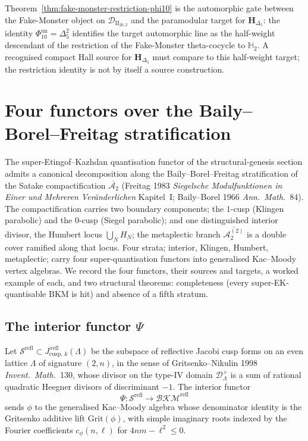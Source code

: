 Theorem~\ref{thm:fake-monster-restriction-phi10} is the automorphic gate
between the Fake-Monster object on $\mathcal{D}_{\mathrm{II}_{26,2}}$ and
the paramodular target for $\mathbf{H}_{\Delta_5}$: the identity
\(\Phi_{10}^{\mathrm{un}}=\Delta_5^2\) identifies the target automorphic
line as the half-weight descendant of the restriction of the Fake-Monster
theta-cocycle to $\mathbb{H}_2$.  A recognised compact Hall source for
$\mathbf{H}_{\Delta_5}$ must compare to this half-weight target; the
restriction identity is not by itself a source construction.

\section{Four functors over the Baily--Borel--Freitag stratification}
\label{sec:four-functors-baily-borel-freitag}

The super-Etingof--Kazhdan quantisation functor of
the structural-genesis section admits a canonical decomposition along
the Baily--Borel--Freitag stratification of the Satake compactification
$\overline{\mathcal A_2}$ (Freitag 1983 \textit{Siegelsche Modulfunktionen
in Einer und Mehreren Ver\"anderlichen} Kapitel~I; Baily--Borel 1966
\textit{Ann.~Math.}~84). The compactification carries two boundary
components; the $1$-cusp (Klingen parabolic) and the $0$-cusp
(Siegel parabolic); and one distinguished interior divisor, the
Humbert locus $\bigcup_N H_N$; the metaplectic branch
$\overline{\mathcal A_2^{(2)}}$ is a double cover ramified along that
locus. Four strata; interior, Klingen, Humbert, metaplectic; carry
four super-quantisation functors into generalised Kac--Moody vertex
algebras. We record the four functors, their sources and
targets, a worked example of each, and two structural theorems:
completeness (every super-EK-quantisable BKM is hit) and absence of
a fifth stratum.

\subsection{The interior functor \texorpdfstring{$\Psi$}{Psi}}
\label{subsec:psi-interior}

\begin{definition}
\label{def:psi-reflective}
Let $\mathcal S^{\mathrm{refl}} \subset
J_{\mathrm{cusp},\,k}^{\,\mathrm{refl}}(\Lambda)$ be the subspace
of reflective Jacobi cusp forms on an even lattice $\Lambda$ of
signature $(2, n)$, in the sense of Gritsenko--Nikulin 1998
\textit{Invent.~Math.}~130, whose divisor on the type-IV domain
$\mathcal D_\Lambda^+$ is a sum of rational quadratic Heegner
divisors of discriminant $-1$. The interior functor
\[
\Psi : \mathcal S^{\mathrm{refl}}
\longrightarrow \mathcal{BKM}^{\mathrm{refl}}
\]
sends $\phi$ to the generalised Kac--Moody algebra whose
denominator identity is the Gritsenko additive lift
$\mathrm{Grit}(\phi)$, with simple imaginary roots indexed by
the Fourier coefficients $c_\phi(n, \ell)$ for
$4nm - \ell^2 \le 0$.
\end{definition}

